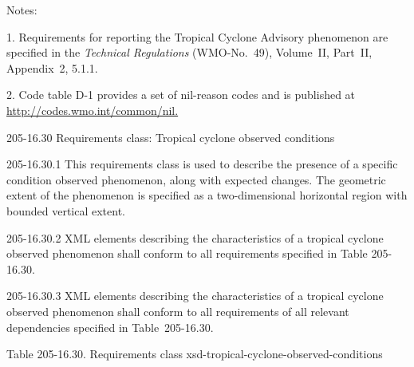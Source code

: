 Notes:

1. Requirements for reporting the Tropical Cyclone Advisory phenomenon are specified in the \emph{Technical Regulations} (WMO-No.~49), Volume~II, Part~II, Appendix~2, 5.1.1.

2. Code table D-1 provides a set of nil-reason codes and is published at \href{http://codes.wmo.int/common/nil}{http://codes.wmo.int/common/nil.}

205-16.30 Requirements class: Tropical cyclone observed conditions

205-16.30.1 This requirements class is used to describe the presence of a specific condition observed phenomenon, along with expected changes. The geometric extent of the phenomenon is specified as a two-dimensional horizontal region with bounded vertical extent.

205-16.30.2 XML elements describing the characteristics of a tropical cyclone observed phenomenon shall conform to all requirements specified in Table 205-16.30.

205-16.30.3 XML elements describing the characteristics of a tropical cyclone observed phenomenon shall conform to all requirements of all relevant dependencies specified in Table~205-16.30.

Table 205-16.30. Requirements class xsd-tropical-cyclone-observed-conditions

